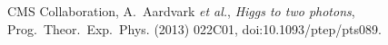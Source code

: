 \begin{thebibliography}{99}

CMS Collaboration, A.~Aardvark {\it et al.},
{\sl Higgs to two photons}, Prog.~Theor.~Exp.~Phys. (2013) 022C01,
doi:10.1093/ptep/pts089.

\end{thebibliography}
